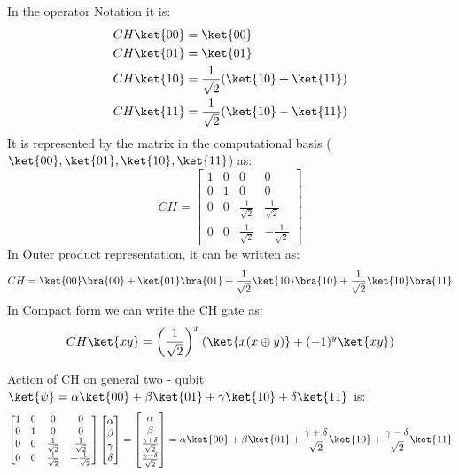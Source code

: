 \documentclass[12pt, oneside]{book}
\theoremstyle{definition}
\theoremstyle{definition}
\theoremstyle{remark}
\begin{document}
In the operator Notation it is:
\begin{align*}
    CH\ket{00}&=\ket{00} \\
    CH\ket{01}&=\ket{01} \\
    CH\ket{10}&=\frac{1}{\sqrt{2}}(\ket{10}+\ket{11}) \\
    CH\ket{11}&=\frac{1}{\sqrt{2}}(\ket{10}-\ket{11})
\end{align*}
It is represented by the matrix in the computational basis ($\ket{00},\ket{01},\ket{10},\ket{11}$) as:
\[
    CH=\begin{bmatrix}
        1 & 0 & 0 & 0 \\
        0 & 1 & 0 & 0 \\
        0 & 0 & \frac{1}{\sqrt{2}} & \frac{1}{\sqrt{2}} \\
        0 & 0 & \frac{1}{\sqrt{2}} & -\frac{1}{\sqrt{2}}
    \end{bmatrix}
\]
In Outer product representation, it can be written as:
\[
    CH=\ket{00}\bra{00}+\ket{01}\bra{01}+\frac{1}{\sqrt{2}}\ket{10}\bra{10}+\frac{1}{\sqrt{2}}\ket{10}\bra{11}
\]
In Compact form we can write the CH gate as:
\[
    CH\ket{xy}=\left(\frac{1}{\sqrt{2}}\right)^x\left(\ket{x(x\oplus y)}+(-1)^y\ket{xy}\right)
\]

Action of CH on general two - qubit $\ket{\psi} = \alpha\ket{00}+\beta\ket{01}+\gamma\ket{10}+\delta\ket{11}$ is:
\[
    \begin{bmatrix} 
        1 & 0 & 0 & 0 \\
        0 & 1 & 0 & 0 \\
        0 & 0 & \frac{1}{\sqrt{2}} & \frac{1}{\sqrt{2}} \\
        0 & 0 & \frac{1}{\sqrt{2}} & -\frac{1}{\sqrt{2}}
    \end{bmatrix}\begin{bmatrix}
        \alpha \\
        \beta \\
        \gamma \\
        \delta
    \end{bmatrix}=\begin{bmatrix}
        \alpha \\
        \beta \\
        \frac{\gamma+\delta}{\sqrt{2}} \\
        \frac{\gamma-\delta}{\sqrt{2}}
    \end{bmatrix}=\alpha\ket{00}+\beta\ket{01}+\frac{\gamma+\delta}{\sqrt{2}}\ket{10}+\frac{\gamma-\delta}{\sqrt{2}}\ket{11}
\]
\end{document}
